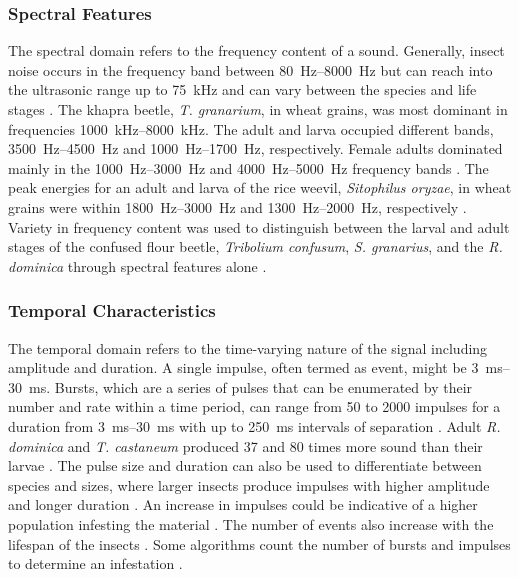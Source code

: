 \documentclass[../Vibro-Acoustic Signatures and Detection Algorithms for Stored Product Insects.tex]{subfiles}
\begin{document}
\subsubsection{Spectral Features}

The spectral domain refers to the frequency content of a sound. Generally, insect noise occurs in the frequency band between \SIrange{80}{8000}{\hertz} \cite{mankinPerspectivePromiseCentury2011} but can reach into the ultrasonic range up to \SI{75}{\kilo\hertz} \cite{klaassenCharacterizationUltrasonicSignals1988} and can vary between the species and life stages \cite{azizifarsaniBioacousticsTrogodermaGranarium2023,fleurat-lessardAcousticDetectionAutomatic2006}. The khapra beetle, \textit{T. granarium}, in wheat grains, was most dominant in frequencies \SIrange{1000}{8000}{\kilo\hertz}. The adult and larva occupied different bands, \SIrange{3500}{4500}{\hertz} and \SIrange{1000}{1700}{\hertz}, respectively. Female adults dominated mainly in the \SIrange{1000}{3000}{\hertz} and \SIrange{4000}{5000}{\hertz} frequency bands \cite{azizifarsaniBioacousticsTrogodermaGranarium2023}. The peak energies for an adult and larva of the rice weevil, \textit{Sitophilus oryzae}, in wheat grains were within \SIrange{1800}{3000}{\hertz} and \SIrange{1300}{2000}{\hertz}, respectively \cite{fleurat-lessardAcousticDetectionAutomatic2006}. Variety in frequency content was used to distinguish between the larval and adult stages of the confused flour beetle, \textit{Tribolium confusum}, \textit{S. granarius}, and the \textit{R. dominica} through spectral features alone \cite{schwabAutomaticAcousticalSurveillance2005}.

\subsubsection{Temporal Characteristics}

The temporal domain refers to the time-varying nature of the signal including amplitude and duration. A single impulse, often termed as event, might be \SIrange{3}{30}{\milli\second}. Bursts, which are a series of pulses that can be enumerated by their number and rate within a time period, can range from 50 to 2000 impulses for a duration from \SIrange{3}{30}{\milli\second} with up to \SI{250}{\milli\second} intervals of separation \cite{klaassenCharacterizationUltrasonicSignals1988}. Adult \textit{R. dominica} and \textit{T. castaneum} produced 37 and 80 times more sound than their larvae \cite{mankinPerspectivePromiseCentury2011}. The pulse size and duration can also be used to differentiate between species and sizes, where larger insects produce impulses with higher amplitude and longer duration \cite{changBioacousticDetectionFour2025}. An increase in impulses could be indicative of a higher population infesting the material \cite{klaassenCharacterizationUltrasonicSignals1988,hagstrumAutomatedAcousticalMonitoring1991}. The number of events also increase with the lifespan of the insects \cite{klaassenCharacterizationUltrasonicSignals1988}. Some algorithms count the number of bursts and impulses to determine an infestation \cite{mankinAcousticIndicatorsTargeted2010,mankinPerspectivePromiseCentury2011, njorogeAcousticPitfallTrap2019, mankinAutomatedApplicationsAcoustics2021}.
\end{document}
